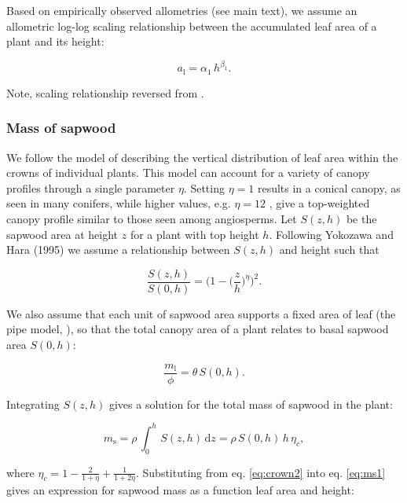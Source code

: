 \documentclass[12pt, a4paper]{article}
\begin{document}
Based on empirically observed allometries (see main text), we assume an
allometric log-log scaling relationship between the accumulated leaf
area of a plant and its height:

\begin{equation}\label{eq:ha}
a_\textrm{l}=\alpha_1 \, h^{\beta_1}.
\end{equation}

Note, scaling relationship reversed from \citep{falster_influence_2011}.

\subsubsection{Mass of sapwood}\label{mass-of-sapwood}

We follow the model of\citep{yokozawa_foliage_1995} describing the
vertical distribution of leaf area within the crowns of individual
plants. This model can account for a variety of canopy profiles through
a single parameter \(\eta\). Setting \(\eta=1\) results in a conical
canopy, as seen in many conifers, while higher values, e.g. \(\eta=12\)
, give a top-weighted canopy profile similar to those seen among
angiosperms. Let \(S(z,h)\) be the sapwood area at height \(z\) for a
plant with top height \(h\). Following Yokozawa and Hara (1995) we
assume a relationship between \(S(z,h)\) and height such that

\begin{equation}\label{eq:crown1}
\frac{S(z,h)}{S(0,h)}= \big(1-\big(\frac{z}{h}\big)^\eta\big)^2.
\end{equation}

We also assume that each unit of sapwood area supports a fixed area of
leaf (the pipe model, \citep{shinozaki_quantitative_1964}), so that the total
canopy area of a plant relates to basal sapwood area \(S(0,h)\):

\begin{equation}\label{eq:crown2}
\frac{m_\textrm{l}}{\phi}= \theta \, S(0,h).
\end{equation}

Integrating \(S(z,h)\) gives a solution for the total mass of sapwood in
the plant:

\begin{equation}\label{eq:ms1}
m_\textrm{s}=\rho \, \int_0^h \, S(z,h) \, \textrm{d}z= \rho \, S(0,h) \, h \, \eta_c, \end{equation}

where
\(\eta_c=1-\frac{2}{1+\eta} + \frac{1}{1+2\eta}\)\citep{yokozawa_foliage_1995}.
Substituting from eq. \ref{eq:crown2} into eq. \ref{eq:ms1} gives an
expression for sapwood mass as a function leaf area and height:
\end{document}
